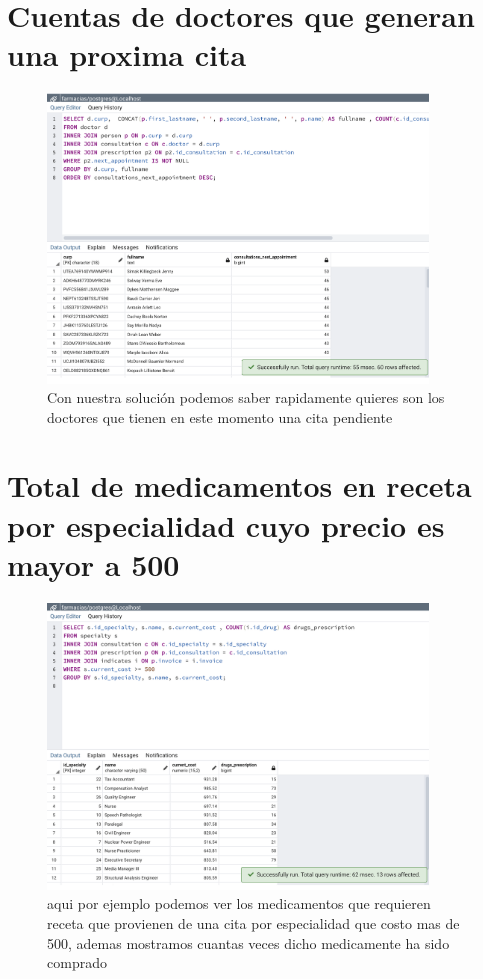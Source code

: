 \documentclass[12pt, fleqn]{report}                             %
\theoremstyle{break}                                            %
\begin{document}
        \clearpage
        \section{Cuentas de doctores que generan una proxima cita}
            
            \begin{figure}[ht]
                \includegraphics[width=0.9\textwidth]{10}
                \caption{Con nuestra solución podemos saber rapidamente quieres son los doctores que tienen en este
                momento una cita pendiente}
            \end{figure}

        \clearpage
        \section{Total de medicamentos en receta por especialidad cuyo precio es mayor a 500}
            
            \begin{figure}[ht]
                \includegraphics[width=0.9\textwidth]{11}
                \caption{aqui por ejemplo podemos ver los medicamentos que requieren receta que provienen de una
                cita por especialidad que costo mas de 500, ademas mostramos cuantas veces dicho medicamente ha sido
                comprado
                }
            \end{figure}
    
\end{document}
